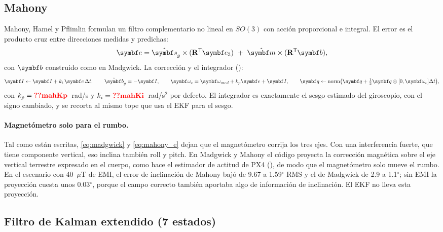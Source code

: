 \subsection{Mahony}

Mahony, Hamel y Pflimlin \cite{mahony08} formulan un filtro complementario
no lineal en $SO(3)$ con acción proporcional e integral. El error es el
producto cruz entre direcciones medidas y predichas:
\begin{equation}
\vect e=\hat{\vect s}_g\times(\R\T\eu)\ +\ \hat{\vect m}\times(\R\T\vect b),
\label{eq:mahony_e}
\end{equation}
con $\vect b$ construido como en Madgwick. La corrección y el integrador
():
\begin{equation}
\vect I\leftarrow\vect I+k_i\,\vect e\,\Delta t,\qquad
\hat{\vect b}_g=-\vect I,\qquad
\vect\omega_c=\vect\omega_{med}+k_p\vect e+\vect I,\qquad
\vect q\leftarrow\operatorname{norm}\!\big(\vect q+\tfrac12\vect q\otimes[0,\vect\omega_c]\Delta t\big),
\label{eq:mahony}
\end{equation}
con $k_p=\val{mahKp}$~rad/s y $k_i=\val{mahKi}$~rad/s$^2$ por defecto. El
integrador es exactamente el sesgo estimado del giroscopio, con el signo
cambiado, y se recorta al mismo tope que usa el EKF para el sesgo.

\paragraph{Magnetómetro solo para el rumbo.} Tal como están escritas,
\eqref{eq:madgwick} y \eqref{eq:mahony_e} dejan que el magnetómetro corrija
los tres ejes. Con una interferencia fuerte, que tiene componente vertical,
eso inclina también roll y pitch. En Madgwick y Mahony el código proyecta la
corrección magnética sobre el eje vertical terrestre expresado en el
cuerpo, como hace el estimador de actitud de PX4
(), de modo que el magnetómetro solo mueve el
rumbo. En el escenario  con 40~$\mu$T de EMI, el
error de inclinación de Mahony bajó de 9.67 a 1.59$^\circ$ RMS y el de
Madgwick de 2.9 a 1.1$^\circ$; sin EMI la proyección cuesta unos
0.03$^\circ$, porque el campo correcto también aportaba algo de información
de inclinación. El EKF no lleva esta proyección.

\subsection{Filtro de Kalman extendido (7 estados)}


